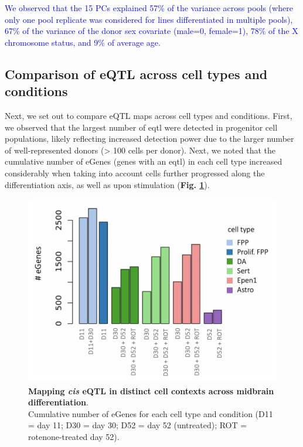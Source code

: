 \textcolor{blue}{We observed that the 15 PCs explained 57\% of the variance across pools (where only one pool replicate was considered for lines differentiated in multiple pools), 67\% of the variance of the donor sex covariate (male=0, female=1), 78\% of the X chromosome status, and 9\% of average age.}

\clearpage

\subsection{Comparison of eQTL across cell types and conditions}

Next, we set out to compare eQTL maps across cell types and conditions.
First, we observed that the largest number of \gls{eqtl} were detected in progenitor cell populations, likely reflecting increased detection power due to the larger number of well-represented donors (> 100 cells per donor). 
Next, we noted that the cumulative number of eGenes (genes with an \gls{eqtl}) in each cell type increased considerably when taking into account cells further progressed along the differentiation axis, as well as upon stimulation (\textbf{Fig. \ref{fig:neuroseq_eqtl}}). 


\begin{figure}[h]
\centering
\includegraphics[width=14cm]{Chapter5/Fig/neuroseq_eqtl_cumulative.png}
\caption[Mapping eQTL across neuronal cell types]{\textbf{Mapping \textit{cis} eQTL in distinct cell contexts across midbrain differentiation}.\\
Cumulative number of eGenes for each cell type and condition (D11 = day 11; D30 = day 30; D52 = day 52 (untreated); ROT = rotenone-treated day 52).}
\label{fig:neuroseq_eqtl}
\end{figure}

